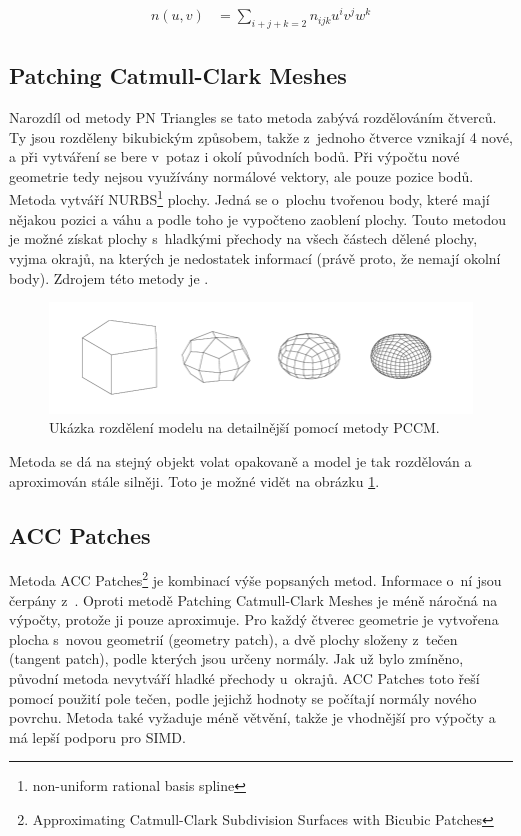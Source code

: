 \begin{align}
    n(u,v) &= \sum_{i+j+k=2} n_{ijk} u^{i}v^{j}w^{k} \nonumber
\end{align}

\subsection*{Patching Catmull-Clark Meshes}
Narozdíl od metody PN Triangles se tato metoda zabývá rozdělováním čtverců. Ty jsou rozděleny bikubickým způsobem, takže z~jednoho čtverce vznikají 4 nové, a při vytváření se bere v~potaz i okolí původních bodů. Při výpočtu nové geometrie tedy nejsou využívány normálové vektory, ale pouze pozice bodů. Metoda vytváří NURBS\footnote{non-uniform rational basis spline} plochy.  Jedná se o~plochu tvořenou body, které mají nějakou pozici a váhu a podle toho je vypočteno zaoblení plochy. Touto metodou je možné získat plochy s~hladkými přechody na všech částech dělené plochy, vyjma okrajů, na kterých je nedostatek informací (právě proto, že nemají okolní body). Zdrojem této metody je \cite{pccm-florida}.

\begin{figure}[H]
	\centering
	\includegraphics[width=40em]{images/pccm/Three-steps-of-Catmull-Clark-subdivision.png}
	\caption[caption]{Ukázka rozdělení modelu na detailnější pomocí metody PCCM.\footnotemark} 
	\label{pccm_comp}
\end{figure}

Metoda se dá na stejný objekt volat opakovaně a model je tak rozdělován a aproximován stále silněji. Toto je možné vidět na obrázku \ref{pccm_comp}.

\subsection*{ACC Patches}
Metoda ACC Patches\footnote{Approximating Catmull-Clark Subdivision Surfaces with Bicubic Patches} je kombinací výše popsaných metod. Informace o~ní jsou čerpány z~\cite{acc-patches}. Oproti metodě Patching Catmull-Clark Meshes je méně náročná na výpočty, protože ji pouze aproximuje. Pro každý čtverec geometrie je vytvořena plocha s~novou geometrií (geometry patch), a dvě plochy složeny z~tečen (tangent patch), podle kterých jsou určeny normály. Jak už bylo zmíněno, původní metoda nevytváří hladké přechody u~okrajů. ACC Patches toto řeší pomocí použití pole tečen, podle jejichž hodnoty se počítají normály nového povrchu. Metoda také vyžaduje méně větvění, takže je vhodnější pro výpočty a má lepší podporu pro SIMD. 

